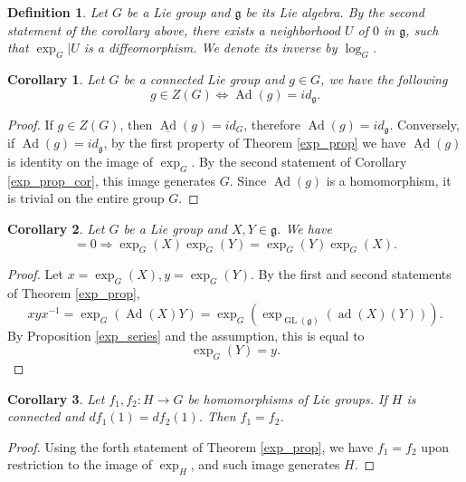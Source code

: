 \documentclass{article}
\newtheorem{definition}{Definition}[section]
\newtheorem{corollary}{Corollary}[section]
\numberwithin{equation}{section}
\DeclareMathOperator{\Ad}{Ad}
\DeclareMathOperator{\ad}{ad}
\DeclareMathOperator{\GL}{GL}
\begin{document}
\begin{definition}
Let $G$ be a Lie group and $\mathfrak{g}$ be its Lie algebra. By the second statement of the corollary above, there exists a neighborhood $U$ of $0$ in $\mathfrak{g}$, such that $\exp_G|U$ is a diffeomorphism. We denote its inverse by $\log_G$.
\end{definition}

\begin{corollary}
Let $G$ be a connected Lie group and $g\in G$, we have the following
\begin{equation*}
g\in Z(G) \Leftrightarrow \Ad(g) = id_{\mathfrak{g}}.
\end{equation*}
\end{corollary}

\begin{proof}
If $g\in Z(G)$, then $\underline{\Ad}(g) = id_G$, therefore $\Ad(g)=id_{\mathfrak{g}}$. Conversely, if $\Ad(g)=id_{\mathfrak{g}}$,  by the first property of Theorem \ref{exp_prop} we have $\underline{\Ad}(g)$ is identity on the image of $\exp_G$. By the second statement of Corollary \ref{exp_prop_cor}, this image generates $G$. Since $\underline{\Ad}(g)$ is a homomorphism, it is trivial on the entire group $G$.
\end{proof}

\begin{corollary}
Let $G$ be a Lie group and $X,Y\in\mathfrak{g}$. We have
\begin{equation*}
[X|Y] = 0\Rightarrow \exp_G(X)\exp_G(Y)=\exp_G(Y)\exp_G(X).
\end{equation*}
\end{corollary}
\begin{proof}
Let $x=\exp_G(X),y=\exp_G(Y)$. By the first and second statements of Theorem \ref{exp_prop}, 
\begin{equation*}
xyx^{-1}=\exp_G(\Ad(X)Y) = \exp_G(\exp_{\GL(\mathfrak{g})}(\ad(X)(Y))).
\end{equation*}
By Proposition \ref{exp_series} and the assumption, this is equal to 
\begin{equation*}
\exp_G(Y)=y.
\end{equation*}
\end{proof}

\begin{corollary}
Let $f_1,f_2:H\to G$ be homomorphisms of Lie groups. If $H$ is connected and $df_1(1)=df_2(1)$. Then $f_1=f_2$.
\end{corollary}

\begin{proof}
Using the forth statement of Theorem \ref{exp_prop}, we have $f_1=f_2$ upon restriction to the image of $\exp_H$, and such image generates $H$. 
\end{proof}
\end{document}
